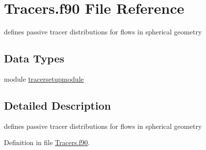 \hypertarget{_tracers_8f90}{\section{Tracers.\+f90 File Reference}
\label{_tracers_8f90}
}


defines passive tracer distributions for flows in spherical geometry  


\subsection*{Data Types}
\begin{DoxyCompactItemize}
\item 
module \hyperlink{classtracersetupmodule}{tracersetupmodule}
\end{DoxyCompactItemize}


\subsection{Detailed Description}
defines passive tracer distributions for flows in spherical geometry 



Definition in file \hyperlink{_tracers_8f90_source}{Tracers.\+f90}.

